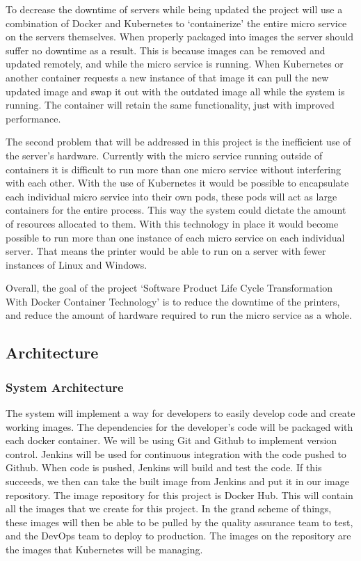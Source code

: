 \documentclass[onecolumn, draftclsnofoot,10pt, compsoc]{IEEEtran}
\begin{document}
To decrease the downtime of servers while being updated the project will use a combination of Docker and Kubernetes to ‘containerize’ the entire micro service on the servers themselves.
When properly packaged into images the server should suffer no downtime as a result.
This is because images can be removed and updated remotely, and while the micro service is running.
When Kubernetes or another container requests a new instance of that image it can pull the new updated image and swap it out with the outdated image all while the system is running. 
The container will retain the same functionality, just with improved performance.

The second problem that will be addressed in this project is the inefficient use of the server's hardware.
Currently with the micro service running outside of containers it is difficult to run more than one micro service without interfering with each other.
With the use of Kubernetes it would be possible to encapsulate each individual micro service into their own pods, these pods will act as large containers for the entire process.
This way the system could dictate the amount of resources allocated to them.
With this technology in place it would become possible to run more than one instance of each micro service on each individual server.
That means the printer would be able to run on a server with fewer instances of Linux and Windows.

Overall, the goal of the project ‘Software Product Life Cycle Transformation With Docker Container Technology’ is to reduce the downtime of the printers, and reduce the amount of hardware required to run the micro service as a whole.

\newpage

\subsection{Architecture}

\subsubsection{System Architecture}

The system will implement a way for developers to easily develop code and create working images. The dependencies for the developer’s code will be packaged with each docker container. We will be using Git and Github to implement version control. Jenkins will be used for continuous integration with the code pushed to Github. When code is pushed, Jenkins will build and test the code. If this succeeds, we then can take the built image from Jenkins and put it in our image repository. The image repository for this project is Docker Hub. This will contain all the images that we create for this project. In the grand scheme of things, these images will then be able to be pulled by the quality assurance team to test, and the DevOps team to deploy to production. The images on the repository are the images that Kubernetes will be managing. 
\end{document}
